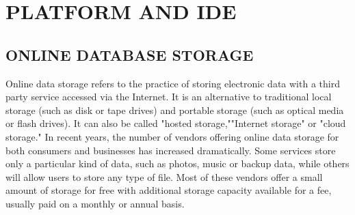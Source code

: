 \documentclass[12pt]{report} %
\begin{document}
\section{PLATFORM AND IDE}
\label{sec:PLATFORM AND IDE}


\subsection{ONLINE DATABASE STORAGE}
\label{subsec:ONLINE DATABASE STORAGE}
Online data storage refers to the practice of storing electronic data with a third party service accessed via the Internet. It is an alternative to traditional local storage (such as disk or tape drives) and portable storage (such as optical media or flash drives). It can also be called "hosted storage,""Internet storage" or "cloud storage."
In recent years, the number of vendors offering online data storage for both consumers and businesses has increased dramatically. Some services store only a particular kind of data, such as photos, music or backup data, while others will allow users to store any type of file. Most of these vendors offer a small amount of storage for free with additional storage capacity available for a fee, usually paid on a monthly or annual basis.
\end{document}
